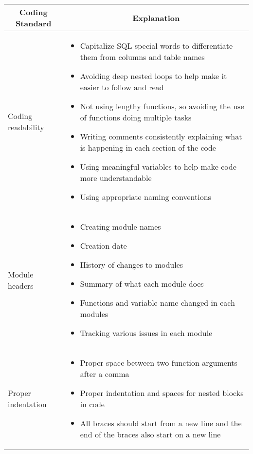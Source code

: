 \documentclass{article}
\begin{document}
\begin{table}[H]
	\centering
	\begin{tabular}{|p{4cm}|p{8cm}|}
	\hline
	\multicolumn{1}{|c|}{\textbf{Coding Standard}} & \multicolumn{1}{c|}{\textbf{Explanation}} 
	\\ \hline
	Coding readability
	&  
	\begin{itemize}
		\item Capitalize SQL special words to differentiate them from columns and table names
		\item Avoiding deep nested loops to help make it easier to follow and read
		\item Not using lengthy functions, so avoiding the use of functions doing multiple tasks
		\item Writing comments consistently explaining what is happening in each section of the code
		\item Using meaningful variables to help make code more understandable
		\item Using appropriate naming conventions
	\end{itemize}                                 
	\\ \hline
	Module headers
	&  
	\begin{itemize}
		\item Creating module names
		\item Creation date
		\item History of changes to modules
		\item Summary of what each module does
		\item Functions and variable name changed in each modules
		\item Tracking various issues in each module
	\end{itemize} 
                             
	\\ \hline
	Proper indentation
	&
	\begin{itemize}
		\item Proper space between two function arguments after a comma
		\item Proper indentation and spaces for nested blocks in code
		\item All braces should start from a new line and the end of the braces also start on a new line
	\end{itemize}
	                             
	\\ \hline
	\end{tabular}
\end{table}
\end{document}
